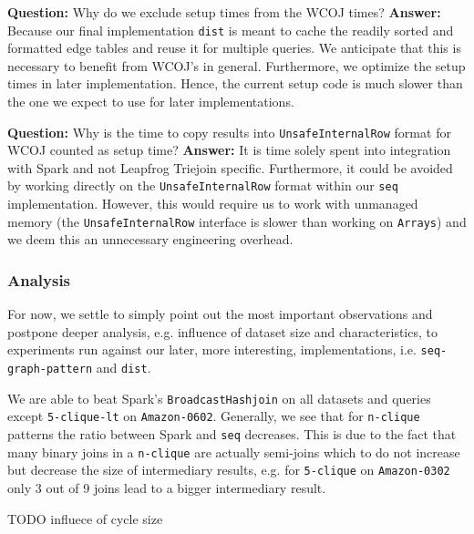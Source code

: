 \textbf{Question:} Why do we exclude setup times from the WCOJ times?
\textbf{Answer:} Because our final implementation \texttt{dist} is meant to cache the readily sorted and formatted edge tables and reuse it for multiple queries.
We anticipate that this is necessary to benefit from WCOJ's in general.
Furthermore, we optimize the setup times in later implementation.
Hence, the current setup code is much slower than the one we expect to use for later implementations.

\textbf{Question:} Why is the time to copy results into \texttt{UnsafeInternalRow} format for WCOJ counted as setup time?
\textbf{Answer:} It is time solely spent into integration with Spark and not Leapfrog Triejoin specific.
Furthermore, it could be avoided by working directly on the \texttt{UnsafeInternalRow} format within our \texttt{seq} implementation.
However, this would require us to work with unmanaged memory (the \texttt{UnsafeInternalRow} interface is slower than working on \texttt{Arrays})
and we deem this an unnecessary engineering overhead.


\subsubsection{Analysis}\label{sssec:seq-analysis}
For now, we settle to simply point out the most important observations and postpone deeper analysis, e.g. influence of dataset size and characteristics,
to experiments run against our later, more interesting, implementations, i.e. \texttt{seq-graph-pattern} and \texttt{dist}.

We are able to beat Spark's \texttt{BroadcastHashjoin} on all datasets and queries except \texttt{5-clique-lt} on \texttt{Amazon-0602}.
Generally, we see that for \texttt{n-clique} patterns the ratio between Spark and \texttt{seq} decreases.
This is due to the fact that many binary joins in a \texttt{n-clique} are actually semi-joins which to do not increase but decrease the size of intermediary results,
e.g. for \texttt{5-clique} on \texttt{Amazon-0302} only 3 out of 9 joins lead to a bigger intermediary result.

TODO influece of cycle size

